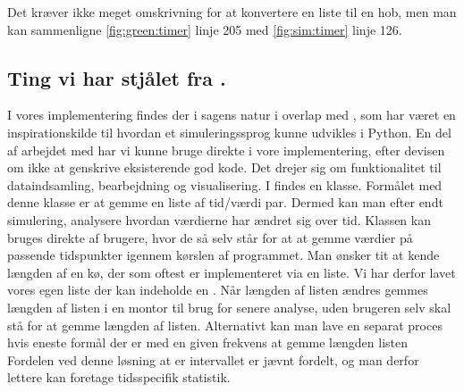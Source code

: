 Det kræver ikke meget omskrivning for at konvertere en liste til en hob, men man kan sammenligne \cref{fig:green:timer} linje 205 med \cref{fig:sim:timer} linje 126. 


\subsection{Ting vi har stjålet fra \simpy.}
I vores implementering findes der i sagens natur i overlap med \simpy, som har været en inspirationskilde til hvordan et simuleringssprog kunne udvikles i Python. En del af arbejdet med \simpy har vi kunne bruge direkte i vore implementering, efter devisen om ikke at genskrive eksisterende god kode. Det drejer sig om funktionalitet til dataindsamling, bearbejdning og visualisering. I \simpy findes en klasse. Formålet med denne klasse er at gemme en liste af tid/værdi par. Dermed kan man efter endt simulering, analysere  hvordan værdierne har ændret sig over tid. Klassen  kan bruges direkte af brugere, hvor de så selv  står for at at gemme værdier på passende tidspunkter igennem kørslen af programmet. Man ønsker tit at kende længden af en kø, der som oftest er implementeret via en liste. Vi har derfor lavet vores egen liste der kan indeholde en . Når længden af listen ændres gemmes længden af listen i en montor til brug for senere analyse, uden brugeren selv skal stå for at gemme længden af listen. Alternativt kan man lave en separat proces hvis eneste formål der er med en given frekvens at gemme længden listen Fordelen ved denne løsning at er intervallet er jævnt fordelt, og man derfor lettere kan foretage tidsspecifik statistik.


